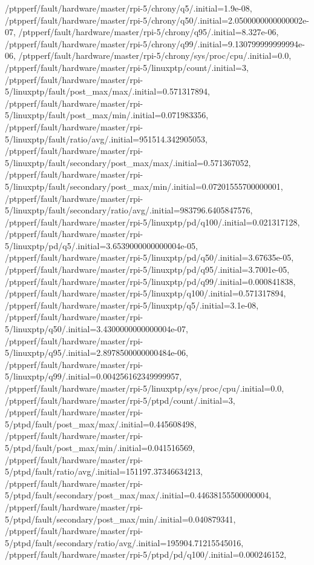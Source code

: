 {    /ptpperf/fault/hardware/master/rpi-5/chrony/q5/.initial=1.9e-08,
    /ptpperf/fault/hardware/master/rpi-5/chrony/q50/.initial=2.0500000000000002e-07,
    /ptpperf/fault/hardware/master/rpi-5/chrony/q95/.initial=8.327e-06,
    /ptpperf/fault/hardware/master/rpi-5/chrony/q99/.initial=9.130799999999994e-06,
    /ptpperf/fault/hardware/master/rpi-5/chrony/sys/proc/cpu/.initial=0.0,
    /ptpperf/fault/hardware/master/rpi-5/linuxptp/count/.initial=3,
    /ptpperf/fault/hardware/master/rpi-5/linuxptp/fault/post_max/max/.initial=0.571317894,
    /ptpperf/fault/hardware/master/rpi-5/linuxptp/fault/post_max/min/.initial=0.071983356,
    /ptpperf/fault/hardware/master/rpi-5/linuxptp/fault/ratio/avg/.initial=951514.342905053,
    /ptpperf/fault/hardware/master/rpi-5/linuxptp/fault/secondary/post_max/max/.initial=0.571367052,
    /ptpperf/fault/hardware/master/rpi-5/linuxptp/fault/secondary/post_max/min/.initial=0.07201555700000001,
    /ptpperf/fault/hardware/master/rpi-5/linuxptp/fault/secondary/ratio/avg/.initial=983796.6405847576,
    /ptpperf/fault/hardware/master/rpi-5/linuxptp/pd/q100/.initial=0.021317128,
    /ptpperf/fault/hardware/master/rpi-5/linuxptp/pd/q5/.initial=3.6539000000000004e-05,
    /ptpperf/fault/hardware/master/rpi-5/linuxptp/pd/q50/.initial=3.67635e-05,
    /ptpperf/fault/hardware/master/rpi-5/linuxptp/pd/q95/.initial=3.7001e-05,
    /ptpperf/fault/hardware/master/rpi-5/linuxptp/pd/q99/.initial=0.000841838,
    /ptpperf/fault/hardware/master/rpi-5/linuxptp/q100/.initial=0.571317894,
    /ptpperf/fault/hardware/master/rpi-5/linuxptp/q5/.initial=3.1e-08,
    /ptpperf/fault/hardware/master/rpi-5/linuxptp/q50/.initial=3.4300000000000004e-07,
    /ptpperf/fault/hardware/master/rpi-5/linuxptp/q95/.initial=2.8978500000000484e-06,
    /ptpperf/fault/hardware/master/rpi-5/linuxptp/q99/.initial=0.004256162349999957,
    /ptpperf/fault/hardware/master/rpi-5/linuxptp/sys/proc/cpu/.initial=0.0,
    /ptpperf/fault/hardware/master/rpi-5/ptpd/count/.initial=3,
    /ptpperf/fault/hardware/master/rpi-5/ptpd/fault/post_max/max/.initial=0.445608498,
    /ptpperf/fault/hardware/master/rpi-5/ptpd/fault/post_max/min/.initial=0.041516569,
    /ptpperf/fault/hardware/master/rpi-5/ptpd/fault/ratio/avg/.initial=151197.37346634213,
    /ptpperf/fault/hardware/master/rpi-5/ptpd/fault/secondary/post_max/max/.initial=0.44638155500000004,
    /ptpperf/fault/hardware/master/rpi-5/ptpd/fault/secondary/post_max/min/.initial=0.040879341,
    /ptpperf/fault/hardware/master/rpi-5/ptpd/fault/secondary/ratio/avg/.initial=195904.71215545016,
    /ptpperf/fault/hardware/master/rpi-5/ptpd/pd/q100/.initial=0.000246152,
}

